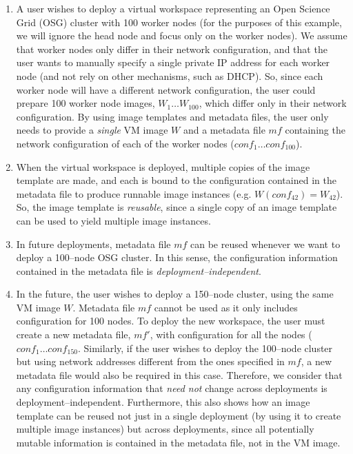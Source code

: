 \documentclass[singlespace]{ccw_chithesis}
\begin{document}
\begin{enumerate}
\item A user wishes to deploy a virtual workspace representing an Open Science Grid (OSG) cluster with 100 worker nodes (for the purposes of this example, we will ignore the head node and focus only on the worker nodes). We assume that worker nodes only differ in their network configuration, and that the user wants to manually specify a single private IP address for each worker node (and not rely on other mechanisms, such as DHCP). So, since each worker node will have a different network configuration, the user could prepare 100 worker node images, $W_1\ldots W_{100}$, which differ only in their network configuration. By using image templates and metadata files, the user only needs to provide a \emph{single} VM image $W$ and a metadata file $mf$ containing the network configuration of each of the worker nodes ($conf_1\ldots conf_{100}$).
\item When the virtual workspace is deployed, multiple copies of the image template are made, and each is bound to the configuration contained in the metadata file to produce runnable image instances (e.g. $W(conf_{42})=W_{42}$). So, the image template is \emph{reusable}, since a single copy of an image template can be used to yield multiple image instances.
\item In future deployments, metadata file $mf$ can be reused whenever we want to deploy a 100--node OSG cluster. In this sense, the configuration information contained in the metadata file is \emph{deployment--independent}.
\item In the future, the user wishes to deploy a 150--node cluster, using the same VM image $W$. Metadata file $mf$ cannot be used as it only includes configuration for 100 nodes. To deploy the new workspace, the user must create a new metadata file, $mf'$, with configuration for all the nodes ($conf_1\ldots conf_{150}$. Similarly, if the user wishes to deploy the 100--node cluster but using network addresses different from the ones specified in $mf$, a new metadata file would also be required in this case. Therefore, we consider that any configuration information that \emph{need not} change across deployments is deployment--independent. Furthermore, this also shows how an image template can be reused not just in a single deployment (by using it to create multiple image instances) but across deployments, since all potentially mutable information is contained in the metadata file, not in the VM image.
\end{enumerate}
\end{document}
